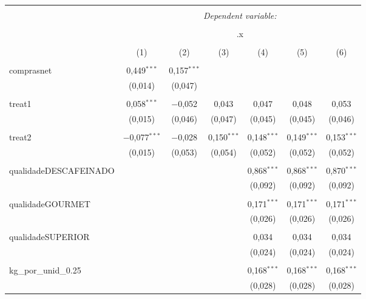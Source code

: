 
\begin{table}[!htbp] \centering 
  \caption{} 
  \label{} 
\begin{tabular}{@{\extracolsep{5pt}}lcccccc} 
\\[-1.8ex]\hline 
\hline \\[-1.8ex] 
 & \multicolumn{6}{c}{\textit{Dependent variable:}} \\ 
\cline{2-7} 
\\[-1.8ex] & \multicolumn{6}{c}{.x} \\ 
\\[-1.8ex] & (1) & (2) & (3) & (4) & (5) & (6)\\ 
\hline \\[-1.8ex] 
 comprasnet & 0,449$^{***}$ & 0,157$^{***}$ &  &  &  &  \\ 
  & (0,014) & (0,047) &  &  &  &  \\ 
  & & & & & & \\ 
 treat1 & 0,058$^{***}$ & $-$0,052 & 0,043 & 0,047 & 0,048 & 0,053 \\ 
  & (0,015) & (0,046) & (0,047) & (0,045) & (0,045) & (0,046) \\ 
  & & & & & & \\ 
 treat2 & $-$0,077$^{***}$ & $-$0,028 & 0,150$^{***}$ & 0,148$^{***}$ & 0,149$^{***}$ & 0,153$^{***}$ \\ 
  & (0,015) & (0,053) & (0,054) & (0,052) & (0,052) & (0,052) \\ 
  & & & & & & \\ 
 qualidadeDESCAFEINADO &  &  &  & 0,868$^{***}$ & 0,868$^{***}$ & 0,870$^{***}$ \\ 
  &  &  &  & (0,092) & (0,092) & (0,092) \\ 
  & & & & & & \\ 
 qualidadeGOURMET &  &  &  & 0,171$^{***}$ & 0,171$^{***}$ & 0,171$^{***}$ \\ 
  &  &  &  & (0,026) & (0,026) & (0,026) \\ 
  & & & & & & \\ 
 qualidadeSUPERIOR &  &  &  & 0,034 & 0,034 & 0,034 \\ 
  &  &  &  & (0,024) & (0,024) & (0,024) \\ 
  & & & & & & \\ 
 kg\_por\_unid\_0.25 &  &  &  & 0,168$^{***}$ & 0,168$^{***}$ & 0,168$^{***}$ \\ 
  &  &  &  & (0,028) & (0,028) & (0,028) \\ 

\end{tabular}
\end{table}
